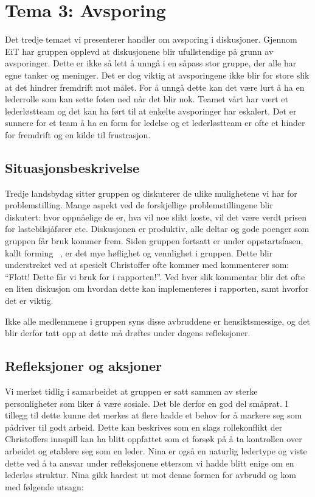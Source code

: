 \chapter{Tema 3: Avsporing}

Det tredje temaet vi presenterer handler om avsporing i diskusjoner. Gjennom EiT har gruppen opplevd at diskusjonene
blir ufullstendige på grunn av avsporinger. Dette er ikke så lett å unngå i en såpass stor gruppe, der alle har egne tanker og meninger.
Det er dog viktig at avsporingene ikke blir for store slik at det hindrer fremdrift mot målet. For å unngå dette kan det være lurt
å ha en lederrolle som kan sette foten ned når det blir nok. Teamet vårt har vært et lederløstteam og det kan ha ført til at 
enkelte avsporinger har eskalert. Det er sunnere for et team å ha en form for ledelse og et lederløstteam er ofte et hinder for 
fremdrift og en kilde til frustrasjon. \cite{Artikkel4}

\section{Situasjonsbeskrivelse}
Tredje landsbydag sitter gruppen og diskuterer de ulike mulighetene vi har for problemstilling. Mange aspekt ved de forskjellige problemstillingene blir diskutert: hvor oppnåelige de er, hva vil noe slikt koste, vil det være verdt prisen for lastebilsjåfører etc. Diskusjonen er produktiv, alle deltar og gode poenger som gruppen får bruk kommer frem. Siden gruppen fortsatt er under oppstartsfasen, kallt forming \cite{forming}\ , er det mye høflighet og vennlighet i gruppen. Dette blir understreket ved at spesielt Christoffer ofte kommer med kommenterer som: ``Flott! Dette får vi bruk for i rapporten!''. Ved hver slik kommentar blir det ofte en liten diskusjon om hvordan dette kan implementeres i rapporten, samt hvorfor det er viktig.

Ikke alle medlemmene i gruppen syns disse avbruddene er hensiktsmessige, og det blir derfor tatt opp at dette må drøftes under dagens refleksjoner.

\section{Refleksjoner og aksjoner}

Vi merket tidlig i samarbeidet at gruppen er satt sammen av sterke personligheter som liker å være sosiale. Det ble derfor en god del småprat. I 
tillegg til dette kunne det merkes at flere hadde et behov for å markere seg som pådriver til godt arbeid. Dette kan beskrives som en slags 
rollekonflikt \cite{Artikkel2} der Christoffers innspill kan ha blitt oppfattet som et forsøk på å ta kontrollen over arbeidet og etablere seg som en 
leder. Nina er også en naturlig ledertype og viste dette ved å ta ansvar under refleksjonene ettersom vi hadde blitt enige om en lederløs 
struktur. Nina gikk hardest ut mot denne formen for avbrudd og kom med følgende utsagn: 

